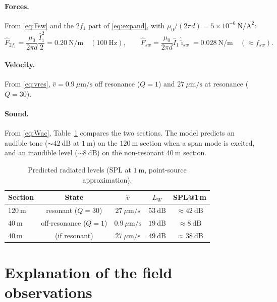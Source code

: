 \documentclass[11pt,a4paper]{article}
\begin{document}
\paragraph{Forces.}
From \eqref{eq:Fsw} and the $2f_1$ part of \eqref{eq:expand}, with
$\mu_0/(2\pi d)=5\times10^{-6}\ \mathrm{N/A^2}$:
\[
\hat F_{2f_1}=\frac{\mu_0}{2\pi d}\frac{\hat I_1^2}{2}=0.20\ \mathrm{N/m}
\quad(100\ \mathrm{Hz}),
\qquad
\hat F_{sw}=\frac{\mu_0}{2\pi d}\hat I_1\hat{\tilde\imath}_{sw}=0.028\ \mathrm{N/m}
\quad(\approx f_{sw}).
\]

\paragraph{Velocity.}
From \eqref{eq:vres}, $\hat v=0.9\ \mu\mathrm{m/s}$ off resonance ($Q=1$) and
$27\ \mu\mathrm{m/s}$ at resonance ($Q=30$).

\paragraph{Sound.}
From \eqref{eq:Wac}, Table~\ref{tab:spl} compares the two sections. The model
predicts an audible tone ($\sim 42\ \mathrm{dB}$ at $1\ \mathrm{m}$) on the
$120\ \mathrm{m}$ section when a span mode is excited, and an inaudible level
($\sim 8\ \mathrm{dB}$) on the non-resonant $40\ \mathrm{m}$ section.

\begin{table}[h]
\centering
\caption{Predicted radiated levels (SPL at $1\ \mathrm{m}$, point-source
approximation).}
\label{tab:spl}
\begin{tabular}{@{}lcccc@{}}
\toprule
Section & State & $\hat v$ & $L_W$ & SPL@1\,m \\
\midrule
$120\ \mathrm{m}$ & resonant ($Q{=}30$)    & $27\ \mu\mathrm{m/s}$  & $53\ \mathrm{dB}$ & $\approx 42\ \mathrm{dB}$ \\
$40\ \mathrm{m}$  & off-resonance ($Q{=}1$)& $0.9\ \mu\mathrm{m/s}$ & $19\ \mathrm{dB}$ & $\approx 8\ \mathrm{dB}$ \\
$40\ \mathrm{m}$  & (if resonant)          & $27\ \mu\mathrm{m/s}$  & $49\ \mathrm{dB}$ & $\approx 38\ \mathrm{dB}$ \\
\bottomrule
\end{tabular}
\end{table}

\section{Explanation of the field observations}\label{sec:length}
\end{document}

